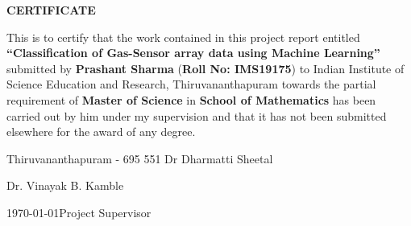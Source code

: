 \begin{center}
{\large{\bf{CERTIFICATE}}}
\end{center}


\noindent
This is to certify that the work contained in this project report entitled \textbf{``Classification of Gas-Sensor array data using
Machine Learning''}  submitted by \textbf{Prashant Sharma} (\textbf{Roll No: IMS19175}) to Indian Institute of Science Education and Research, Thiruvananthapuram towards the partial requirement of {\bf Master of Science} in \textbf{School of Mathematics} has been carried out by him under my supervision and that it has not been submitted elsewhere for the award of any degree.


\vspace{4cm}

\noindent Thiruvananthapuram - 695 551 \hfill Dr Dharmatti Sheetal

\noindent \hfill Dr. Vinayak B. Kamble

\noindent \today \hfill Project Supervisor

\clearpage

